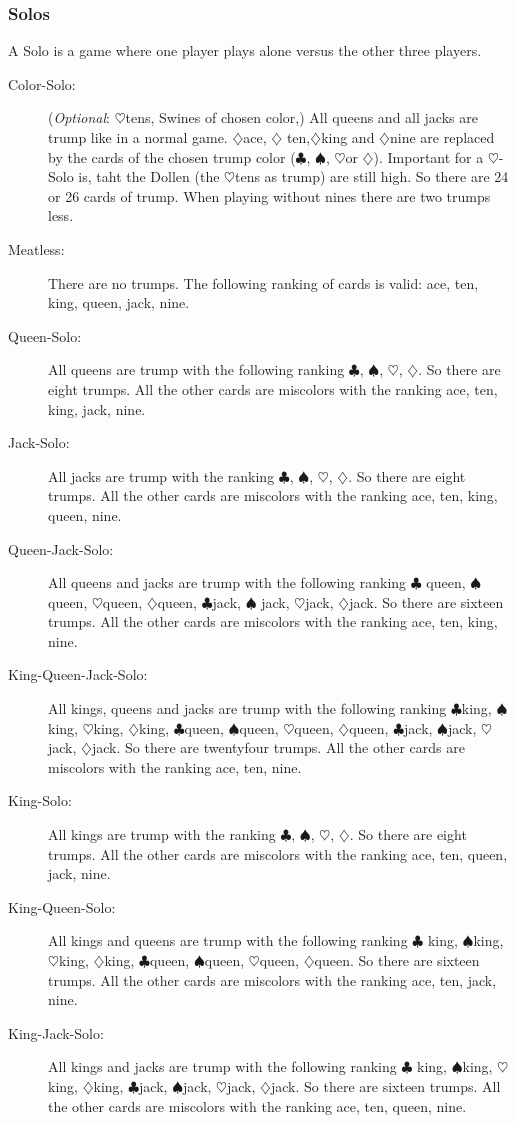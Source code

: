 \documentclass[12pt,a4paper]{article}
\newcommand{\kreuz}{$\clubsuit$}
\newcommand{\pik}{$\spadesuit$}
\newcommand{\herz}{$\heartsuit$}
\newcommand{\karo}{$\diamondsuit$}
\newcommand{\Optional}{\textit{Optional}}
\begin{document}
\subsubsection{\label{solo}Solos}
A Solo is a game where one player plays alone versus the other
three players.
\begin{description}
\item[Color-Solo:]
(\Optional: \herz tens, Swines of chosen color,) All queens and
all jacks are trump like in a normal game. \karo ace, \karo
ten,\karo king and \karo nine are replaced by the cards of the
chosen trump color (\kreuz, \pik, \herz or \karo). Important for
a \herz-Solo is, taht the Dollen (the \herz tens as trump) are still high.
So there are 24 or 26 cards of trump. When playing without nines
there are two trumps less.
\item[Meatless:]
There are no trumps. The following ranking of cards is valid:
ace, ten, king, queen, jack, nine.
\item[Queen-Solo:]
All queens are trump with the following ranking \kreuz, \pik,
\herz, \karo. So there are eight trumps. All the other cards are
miscolors with the ranking ace, ten, king, jack, nine.
\item[Jack-Solo:]
All jacks are trump with the ranking \kreuz, \pik, \herz, \karo.
So there are eight trumps. All the other cards are miscolors with
the ranking ace, ten, king, queen, nine.
\item[Queen-Jack-Solo:]
All queens and jacks are trump with the following ranking \kreuz
queen, \pik queen, \herz queen, \karo queen, \kreuz jack, \pik
jack, \herz jack, \karo jack. So there are sixteen trumps. All
the other cards are miscolors with the ranking ace, ten, king,
nine.
\item[King-Queen-Jack-Solo:]
All kings, queens and jacks are trump with the following ranking
\kreuz king, \pik king, \herz king, \karo king, \kreuz queen,
\pik queen, \herz queen, \karo queen, \kreuz jack, \pik jack,
\herz jack, \karo jack. So there are twentyfour trumps. All the
other cards are miscolors with the ranking ace, ten, nine.
\item[King-Solo:]
All kings are trump with the ranking \kreuz, \pik, \herz, \karo.
So there are eight trumps. All the other cards are miscolors with
the ranking ace, ten, queen, jack, nine.
\item[King-Queen-Solo:]
All kings and queens are trump with the following ranking \kreuz
king, \pik king, \herz king, \karo king, \kreuz queen, \pik queen,
\herz queen, \karo queen. So there are sixteen trumps. All the
other cards are miscolors with the ranking ace, ten, jack, nine.
\item[King-Jack-Solo:]
All kings and jacks are trump with the following ranking \kreuz
king, \pik king, \herz king, \karo king, \kreuz jack, \pik jack,
\herz jack, \karo jack. So there are sixteen trumps. All the other
cards are miscolors with the ranking ace, ten, queen, nine.
\end{description}
\end{document}
